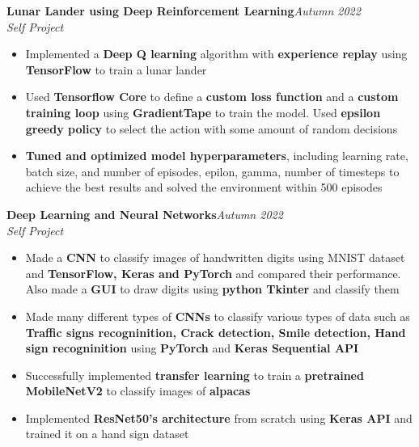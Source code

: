 \documentclass{article}
\begin{document}
\vspace{\baselineskip}
\vspace{-15pt}
\noindent\textbf{\large Lunar Lander using Deep Reinforcement Learning}\hfill{\sl \small Autumn 2022}\\
{\it Self Project}
\\\vspace{-17pt}
\begin{itemize}[itemsep = -1.4 mm, leftmargin=*]
    \item Implemented a \textbf{Deep Q learning} algorithm with \textbf{experience replay} using \textbf{TensorFlow} to train a lunar lander
    \item Used \textbf{Tensorflow Core} to define a \textbf{custom loss function} and a \textbf{custom training loop} using \textbf{GradientTape} to train the model. Used \textbf{epsilon greedy policy} to select the action with some amount of random decisions
    \item \textbf{Tuned and optimized model hyperparameters}, including learning rate, batch size, and number of episodes, epilon, gamma, number of timesteps to achieve the best results and solved the environment within 500 episodes
\end{itemize}
\vspace{\baselineskip}
\vspace{-15pt}
\noindent\textbf{\large Deep Learning and Neural Networks}\hfill{\sl \small Autumn 2022}\\
{\it Self Project}
\\\vspace{-17pt}
\begin{itemize}[itemsep = -1.4 mm, leftmargin=*]
    \item Made a \textbf{CNN} to classify images of handwritten digits using MNIST dataset and \textbf{TensorFlow, Keras and PyTorch} and compared their performance. Also made a \textbf{GUI} to draw digits using \textbf{python Tkinter} and classify them
    \item Made many different types of \textbf{CNNs} to classify various types of data such as \textbf{Traffic signs recogninition, Crack detection, Smile detection, Hand sign recogninition} using \textbf{PyTorch} and \textbf{Keras Sequential API}
    \item Successfully implemented \textbf{transfer learning} to train a \textbf{pretrained MobileNetV2} to classify images of \textbf{alpacas}
    \item Implemented \textbf{ResNet50's architecture} from scratch using \textbf{Keras API} and trained it on a hand sign dataset
\end{itemize}
\end{document}
